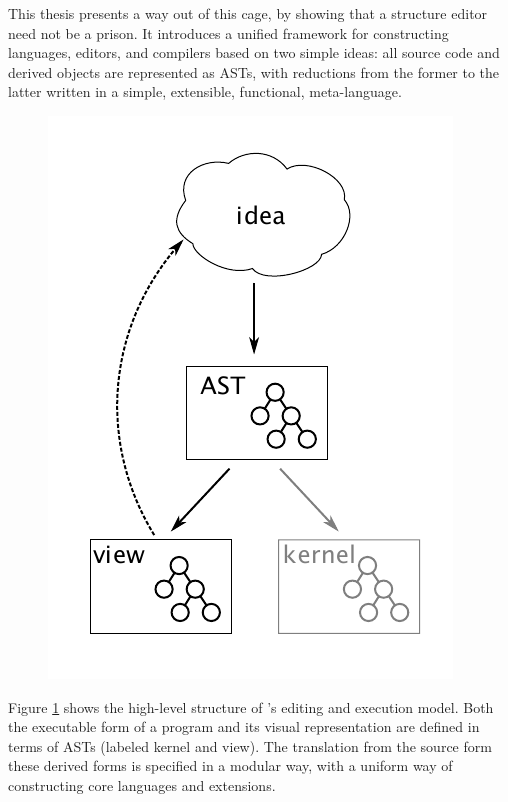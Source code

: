
This thesis presents a way out of this cage, by showing that a structure editor need not be a prison. It introduces a unified framework for constructing languages, editors, and compilers based on two simple ideas: all source code and derived objects are represented as ASTs, with reductions from the former to the latter written in a simple, extensible, functional, meta-language.

\begin{figure}[h]
  \begin{center}

  \includegraphics[scale=0.75]{src/image/figure2.pdf}
  \end{center}

  \caption{\Meta}
  \label{fig-2}
\end{figure}

Figure \ref{fig-2} shows the high-level structure of \Meta's editing and execution model. Both the executable form of a program and its visual representation are defined in terms of ASTs (labeled kernel and view). The translation from the source form these derived forms is specified in a modular way, with a uniform way of constructing core languages and extensions.

